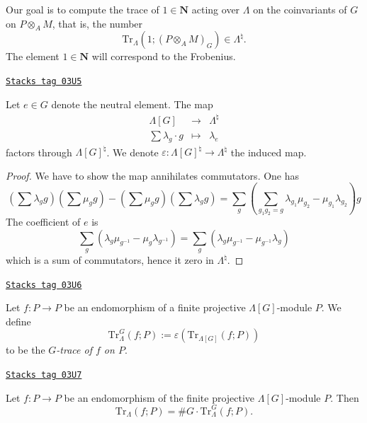\medskip\noindent
Our goal is to compute the trace of $1 \in \mathbf{N}$ acting over $\Lambda$
on the coinvariants of $G$ on $P \otimes_A M$, that is, the number
$$
\text{Tr}_{\Lambda}\left(1; \left(P \otimes_A M\right)_G\right) \in
\Lambda^\natural.
$$
The element $1\in \mathbf{N}$ will correspond to the Frobenius.

\begin{lemma}[Epsilon]
\label{trace-lemma-epsilon}
\href{https://stacks.math.columbia.edu/tag/03U5}{\texttt{Stacks tag 03U5}}

Let $e\in G$ denote the neutral element. The map
$$
\begin{matrix}
\Lambda[G] & \longrightarrow & \Lambda^{\natural}\\
\sum \lambda_g\cdot g & \longmapsto & \lambda_e
\end{matrix}
$$
factors through $\Lambda[G]^\natural$. We denote
$\varepsilon : \Lambda[G]^\natural\to \Lambda^\natural$ the induced map.
\end{lemma}

\begin{proof}
We have to show the map annihilates commutators. One has
$$
\left(\sum\lambda_g g\right)\left(\sum\mu_g g\right)-\left(\sum \mu_g
g\right)\left(\sum\lambda_g g\right)
= \sum_g\left(\sum_{g_1g_2=g}
\lambda_{g_1}\mu_{g_2}-\mu_{g_1}\lambda_{g_2}\right)g
$$
The coefficient of $e$ is
$$
\sum_g\left(\lambda_g\mu_{g^{-1}}-\mu_g\lambda_{g^{-1}}\right) =
\sum_g\left(\lambda_g\mu_{g^{-1}}-\mu_{g^{-1}}\lambda_g\right)
$$
which is a sum of commutators, hence it zero in $\Lambda^\natural$.
\end{proof}

\begin{definition}[Trace G]
\label{trace-definition-trace-G}
\href{https://stacks.math.columbia.edu/tag/03U6}{\texttt{Stacks tag 03U6}}

Let $f : P\to P$ be an
endomorphism of a finite projective $\Lambda[G]$-module
$P$. We define
$$
\text{Tr}_{\Lambda}^G(f; P) := \varepsilon\left(\text{Tr}_{\Lambda[G]}(f;
P)\right)
$$
to be the {\it $G$-trace of $f$ on $P$}.
\end{definition}

\begin{lemma}
\label{trace-lemma-lambda-trace}
\href{https://stacks.math.columbia.edu/tag/03U7}{\texttt{Stacks tag 03U7}}

Let $f : P\to P$ be an endomorphism of the finite projective
$\Lambda[G]$-module $P$. Then
$$
\text{Tr}_{\Lambda}(f; P) = \# G \cdot \text{Tr}_\Lambda^G(f; P).
$$
\end{lemma}

